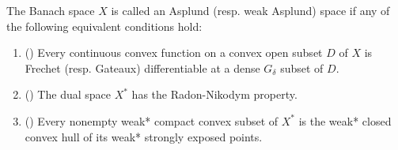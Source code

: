 \begin{definition}
  \label{def:asplund_space}
  The Banach space $X$ is called an Asplund (resp. weak Asplund) space if any of the following equivalent conditions hold:

  \begin{enumerate}
    \item(\cite[theorem 2.14]{Phelps1993}) Every continuous convex function on a convex open subset $D$ of $X$ is Frechet (resp. Gateaux) differentiable at a dense $G_\delta$ subset of $D$.
    \item(\cite[definition 5.2]{Phelps1993}) The dual space $X^*$ has the Radon-Nikodym property.
    \item(\cite[theorem 5.12]{Phelps1993}) Every nonempty weak* compact convex subset of $X^*$ is the weak* closed convex hull of its weak* strongly exposed points.
  \end{enumerate}
\end{definition}
